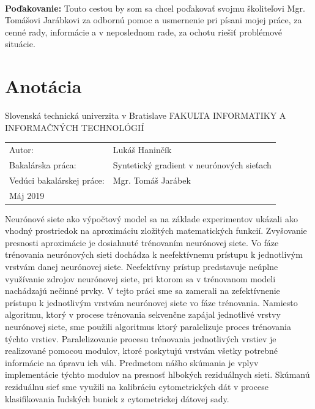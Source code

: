 \documentclass[12pt, twoside]{book}
\newcommand{\itab}[1]{\hspace{0em}\rlap{#1}}
\newcommand{\tab}[1]{\hspace{.31\textwidth}\rlap{#1}}
\begin{document}
 
~

\vfill
{\bf Poďakovanie:} Touto cestou by som sa chcel poďakovať svojmu školiteľovi Mgr. Tomášovi Jarábkovi za odbornú pomoc a usmernenie pri písani mojej práce, za cenné rady, informácie a v neposlednom rade, za ochotu riešiť problémové situácie.
\newpage 
\afterpage{\null\thispagestyle{empty}\newpage}


\section*{Anotácia}
Slovenská technická univerzita v Bratislave
\newline
FAKULTA INFORMATIKY A INFORMAČNÝCH TECHNOLÓGIÍ
\newline
\itab{Študijný program:}    \tab{Informatika}
\begin{table}[h!]
\renewcommand{\arraystretch}{1.4}
\begin{tabular}{@{}ll}
Autor: & Lukáš Haninčík \\
Bakalárska práca: & Syntetický gradient v neurónových sieťach \\
Vedúci bakalárskej práce: & Mgr. Tomáš Jarábek \\
Máj 2019
\end{tabular}
\end{table}
\newline
\newline
Neurónové siete ako výpočtový model sa na základe experimentov ukázali ako vhodný prostriedok na aproximáciu zložitých matematických funkcií. Zvyšovanie presnosti aproximácie je dosiahnuté trénovaním neurónovej siete. Vo fáze trénovania neurónových sieti dochádza k neefektívnemu prístupu k jednotlivým vrstvám danej neurónovej siete. Neefektívny prístup predstavuje neúplne využívanie zdrojov neurónovej siete, pri ktorom sa v trénovanom modeli nachádzajú nečinné prvky. V tejto práci sme sa zamerali na zefektívnenie prístupu k jednotlivým vrstvám neurónovej siete vo fáze trénovania. Namiesto algoritmu, ktorý v procese trénovania sekvenčne zapájal jednotlivé vrstvy neurónovej siete, sme použili algoritmus ktorý paralelizuje proces trénovania týchto vrstiev. Paralelizovanie procesu trénovania jednotlivých vrstiev je realizované pomocou modulov, ktoré poskytujú vrstvám všetky potrebné informácie na úpravu ich váh. Predmetom nášho skúmania je vplyv implementácie týchto modulov na presnosť hlbokých reziduálnych sieti. Skúmanú reziduálnu sieť sme využili na kalibráciu cytometrických dát v procese klasifikovania ľudských buniek z cytometrickej dátovej sady. 
\end{document}
